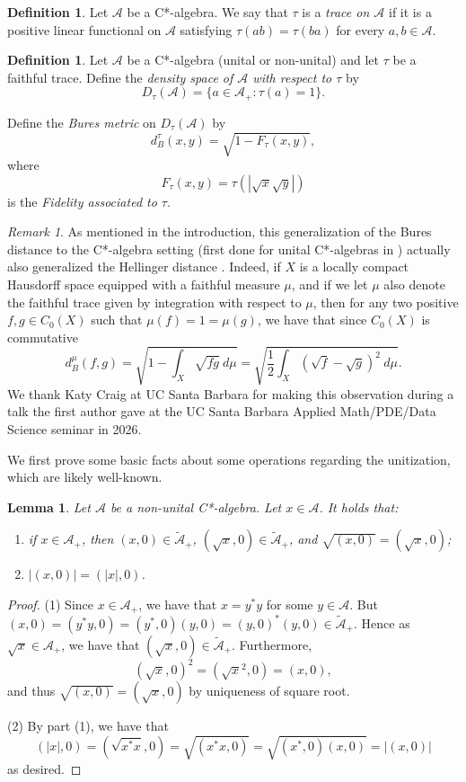 \documentclass{amsart}
\theoremstyle{plain}
\newtheorem{lemma}[theorem]{Lemma}
\theoremstyle{definition}
\newtheorem{definition}[theorem]{Definition}
\theoremstyle{remark}
\newtheorem{remark}[theorem]{Remark}
\numberwithin{equation}{section}
\newcommand{\A}{{\mathcal{A}}}
\newcommand{\wt}[1]{{\widetilde{#1}}}
\begin{document}
\begin{definition}
    Let $\A$ be a C*-algebra. We say that $\tau$ is a {\em trace on $\A$} if it is a positive linear functional on $\A$ satisfying $\tau(ab)=\tau(ba)$ for every $a,b\in \A$.
\end{definition}

\begin{definition}\label{d:density-Bures}
    Let $\A$ be a   C*-algebra (unital or non-unital) and let $\tau$ be a faithful trace. Define the {\em density space of $\A$ with respect to $\tau$} by
    \[
    D_\tau(\A)=\{ a\in \A_+: \tau(a)=1\}.
    \]

    Define the {\em Bures metric} on $D_\tau(\A)$ by
    \[
    d_B^\tau(x,y)=\sqrt{1- F_\tau(x,y)},
    \]
    where 
    \[
    F_\tau(x,y)=\tau(|\sqrt{x}\sqrt{y}|)
    \]
    is the {\em Fidelity   associated to $\tau$}.
\end{definition}

\begin{remark}\label{r:hellinger}
    As mentioned in the introduction, this generalization of the Bures distance to the C*-algebra setting (first done for unital C*-algebras in \cite{Farenick-Rahaman17}) actually also generalized the Hellinger distance \cite{Hellinger}. Indeed, if $X$ is a locally compact Hausdorff space equipped with a faithful measure $\mu$, and if we let $\mu$ also denote the faithful trace given by  integration with respect to $\mu$, then 
for any two positive $f,g\in C_0(X)$ such that $\mu(f)=1=\mu(g)$, we have that since $C_0(X)$ is commutative
\[
d_B^\mu(f,g)=\sqrt{1-\int_X \sqrt{fg} \ d \mu}=\sqrt{\frac{1}{2}\int_X \left( \sqrt{f}-\sqrt{g}\right)^2 \ d\mu}.
\]
    We thank Katy Craig at UC Santa Barbara for making this observation during a talk the first author gave at the UC Santa Barbara Applied Math/PDE/Data Science seminar in 2026.
\end{remark}

We first prove some basic facts about some operations regarding the unitization, which are  likely well-known.
\begin{lemma}\label{l:unitize-root-abs}
    Let $\A$ be a non-unital C*-algebra. Let $x\in \A$. It holds that:
    \begin{enumerate}
        \item if $x\in \A_+$, then $(x, 0)\in \wt{\A}_+ $, $(\sqrt{x}, 0)\in \wt{\A}_+$, and $\sqrt{(x,0)}=\left( \sqrt{x}, 0\right)$;
        \item $|(x,0)|=(|x|,0)$.
    \end{enumerate}
\end{lemma}
\begin{proof}
    (1) Since $x\in \A_+$, we have that $x=y^*y$ for some $y\in \A$. But $(x,0)=(y^*y,0)=(y^*,0)(y,0)=(y,0)^*(y,0)\in \wt{\A}_+$. Hence as $\sqrt{x}\in \A_+$, we have that $(\sqrt{x},0)\in \wt{\A}_+$. Furthermore, 
    \[
    (\sqrt{x},0)^2=(\sqrt{x}^2,0)=(x,0),
    \]
    and thus $\sqrt{(x,0)}=(\sqrt{x},0)$ by uniqueness of square root.

    (2) By part (1), we have that 
    \[
    (|x|, 0)=\left( \sqrt{x^*x},0\right)=\sqrt{(x^*x, 0)}=\sqrt{(x^*,0)(x,0)}=|(x,0)|
    \]
    as desired.
\end{proof}
\end{document}
